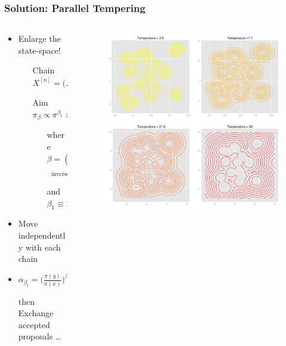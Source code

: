 \documentclass[xetex]{beamer}
\begin{document}
	\begin{frame}[t]\frametitle{Solution: Parallel Tempering}    
		\begin{columns}
			\begin{column}[t]{.5\textwidth}
			    \begin{itemize}
			    	\item Enlarge the state-space!
			    	\begin{itemize}
			    		\item[Chain] 	$X^{[n]} 	= \Big( X^{[n]}_1, \dots, X^{[n]}_L \Big)$ 
			    		\item[Aim] 		$\pi_\beta 	\propto \pi^{\beta_1} \times \dots \times \pi^{\beta_L}$
			    		\begin{itemize}
			    			\item[where] $\underbrace{\beta = (\beta_1, \dots, \beta_L)}_\text{inverse temperatures}$ 
			    			\item[and] 	$\beta_1 \equiv 1$	 
			    		\end{itemize}
			    	\end{itemize}
			    	\item  	Move independently with each chain
			    	\item  	$\alpha_{\beta_l} = \Big(\frac{\pi(y)}{\pi(x)}\Big)^{\beta_l} > \frac{\pi(y)}{\pi(x)} = \alpha_{\beta_1} $
			    	\item[then]  	Exchange accepted proposals \dots
			    \end{itemize}
			\end{column}
			\begin{column}[t]{.5\textwidth}	
				\begin{center}
					\begin{figure}
						\includegraphics[width=\textwidth, keepaspectratio]{./picts/Liang_Contour_plots.png}
					\end{figure}	
				\end{center}
			\end{column}
		\end{columns}	
	\end{frame}
\end{document}
